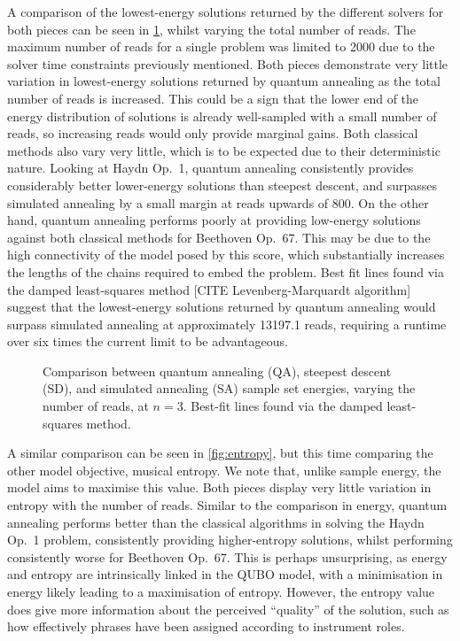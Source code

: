 \documentclass[12pt]{article}
\theoremstyle{definition}
\begin{document}
A comparison of the lowest-energy solutions returned by the different solvers for both pieces can be seen in \cref{fig:reads}, whilst varying the total number of reads. The maximum number of reads for a single problem was limited to \num{2000} due to the solver time constraints previously mentioned. Both pieces demonstrate very little variation in lowest-energy solutions returned by quantum annealing as the total number of reads is increased. This could be a sign that the lower end of the energy distribution of solutions is already well-sampled with a small number of reads, so increasing reads would only provide marginal gains. Both classical methods also vary very little, which is to be expected due to their deterministic nature.
Looking at Haydn Op.\ 1, quantum annealing consistently provides considerably better lower-energy solutions than steepest descent, and surpasses simulated annealing by a small margin at reads upwards of \num{800}.
On the other hand, quantum annealing performs poorly at providing low-energy solutions against both classical methods for Beethoven Op.\ 67. This may be due to the high connectivity of the model posed by this score, which substantially increases the lengths of the chains required to embed the problem. Best fit lines found via the damped least-squares method [CITE Levenberg-Marquardt algorithm] suggest that the lowest-energy solutions returned by quantum annealing would surpass simulated annealing at approximately \num{13197.1} reads, requiring a runtime over six times the current limit to be advantageous.

\begin{figure}[ht]
    \centering\footnotesize
    
    \caption{Comparison between quantum annealing (QA), steepest descent (SD), and simulated annealing (SA) sample set energies, varying the number of reads, at $n=3$. Best-fit lines found via the damped least-squares method.}
    \label{fig:reads}
\end{figure}

A similar comparison can be seen in \cref{fig:entropy}, but this time comparing the other model objective, musical entropy. We note that, unlike sample energy, the model aims to maximise this value. Both pieces display very little variation in entropy with the number of reads. Similar to the comparison in energy, quantum annealing performs better than the classical algorithms in solving the Haydn Op.\ 1 problem, consistently providing higher-entropy solutions, whilst performing consistently worse for Beethoven Op.\ 67. This is perhaps unsurprising, as energy and entropy are intrinsically linked in the QUBO model, with a minimisation in energy likely leading to a maximisation of entropy. However, the entropy value does give more information about the perceived ``quality'' of the solution, such as how effectively phrases have been assigned according to instrument roles.
\end{document}
